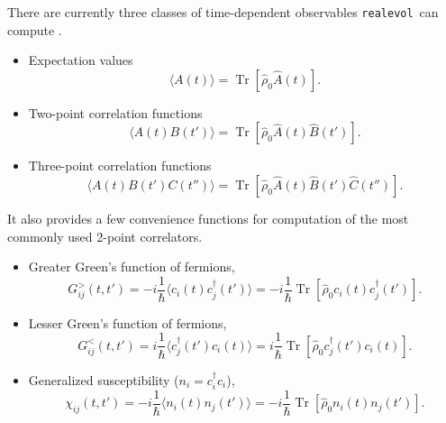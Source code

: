\documentclass[]{article}
\DeclareMathOperator{\Tr}{Tr}
\newcommand{\realevol}{\texttt{realevol}}
\newcommand{\aver}[1]{\ensuremath{\langle#1\rangle}}
\begin{document}
There are currently three classes of time-dependent observables \realevol\ can compute \cite{NoneqDMFT}.
\begin{itemize}
    \item Expectation values
    \begin{equation}\label{1point_corr}
        \aver{A(t)} = \Tr[\hat\rho_0 \hat A(t)].
    \end{equation}
    
    \item Two-point correlation functions
    \begin{equation}\label{2point_corr}
        \aver{A(t) B(t')} = \Tr[\hat\rho_0 \hat A(t) \hat B(t')].
    \end{equation}
    
    \item Three-point correlation functions
    \begin{equation}\label{3point_corr}
    \aver{A(t) B(t') C(t'')} = \Tr[\hat\rho_0 \hat A(t) \hat B(t') \hat C(t'')].
    \end{equation}
\end{itemize}

It also provides a few convenience functions for computation of the most commonly used 2-point correlators.

\begin{itemize}
    \item Greater Green's function of fermions,
    \begin{equation}\label{greater_gf}
        G^>_{ij}(t,t') = -i\frac{1}{\hbar}\aver{c_i(t) c^\dagger_j(t')} =
        -i\frac{1}{\hbar}\Tr\left[\hat\rho_0 c_i(t) c^\dagger_j(t')\right].
    \end{equation}

    \item Lesser Green's function of fermions,
    \begin{equation}\label{lesser_gf}
        G^<_{ij}(t,t') = i\frac{1}{\hbar}\aver{c^\dagger_j(t') c_i(t)} =
        i\frac{1}{\hbar}\Tr\left[\hat\rho_0 c^\dagger_j(t') c_i(t)\right].
    \end{equation}

    \item Generalized susceptibility ($n_i = c^\dagger_i c_i$),
    \begin{equation}\label{susceptibility}
        \chi_{ij}(t,t') = -i\frac{1}{\hbar}\aver{n_i(t) n_j(t')} =
        -i\frac{1}{\hbar}\Tr\left[\hat\rho_0 n_i(t) n_j(t')\right].
    \end{equation}
\end{itemize}
\end{document}
